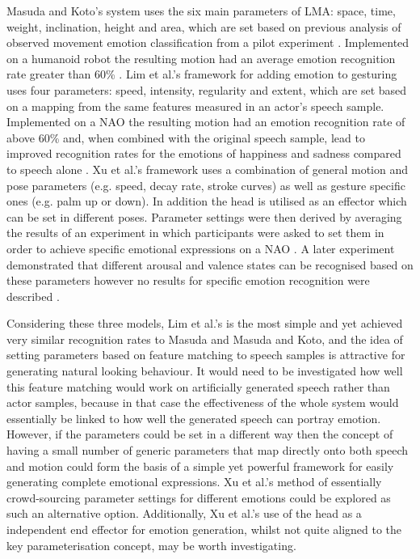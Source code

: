 \documentclass[11pt]{article}
\begin{document}
Masuda and Koto's system uses the six main parameters of LMA: space, time, weight, inclination, height and area, which are set based on previous analysis of observed movement emotion classification from a pilot experiment \cite{masuda2009emotion}. Implemented on a humanoid robot the resulting motion had an average emotion recognition rate greater than 60\% \cite{masuda2010motion}. Lim et al.'s framework for adding emotion to gesturing uses four parameters: speed, intensity, regularity and extent, which are set based on a mapping from the same features measured in an actor's speech sample. Implemented on a NAO the resulting motion had an emotion recognition rate of above 60\% and, when combined with the original speech sample, lead to improved recognition rates for the emotions of happiness and sadness compared to speech alone \cite{lim2011converting}. Xu et al.'s framework uses a combination of general motion and pose parameters (e.g. speed, decay rate, stroke curves) as well as gesture specific ones (e.g. palm up or down). In addition the head is utilised as an effector which can be set in different poses. Parameter settings were then derived by averaging the results of an experiment in which participants were asked to set them in order to achieve specific emotional expressions on a NAO \cite{xu2013mood}. A later experiment demonstrated that different arousal and valence states can be recognised based on these parameters however no results for specific emotion recognition were described \cite{xu2013bodily}.

Considering these three models, Lim et al.'s is the most simple and yet achieved very similar recognition rates to Masuda and Masuda and Koto, and the idea of setting parameters based on feature matching to speech samples is attractive for generating natural looking behaviour. It would need to be investigated how well this feature matching would work on artificially generated speech rather than actor samples, because in that case the effectiveness of the whole system would essentially be linked to how well the generated speech can portray emotion. However, if the parameters could be set in a different way then the concept of having a small number of generic parameters that map directly onto both speech and motion could form the basis of a simple yet powerful framework for easily generating complete emotional expressions. Xu et al.'s method of essentially crowd-sourcing parameter settings for different emotions could be explored as such an alternative option. Additionally, Xu et al.'s use of the head as a independent end effector for emotion generation, whilst not quite aligned to the key parameterisation concept, may be worth investigating. 
\end{document}
